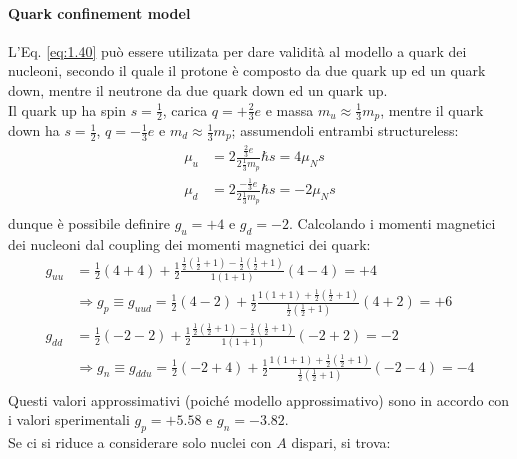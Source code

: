 \paragraph{Quark confinement model}

L'Eq. \ref{eq:1.40} può essere utilizata per dare validità al modello a quark dei nucleoni, secondo il quale il protone è composto da due quark up ed un quark down, mentre il neutrone da due quark down ed un quark up.\\
Il quark up ha spin $ s = \frac{1}{2} $, carica $ q = +\frac{2}{3}e $ e massa $ m_u \approx \frac{1}{3}m_p $, mentre il quark down ha $ s = \frac{1}{2} $, $ q = -\frac{1}{3}e $ e $ m_d \approx \frac{1}{3}m_p $; assumendoli entrambi structureless:
\begin{align*}
	\mu_u &= 2 \frac{\frac{2}{3} e}{2 \frac{1}{3}m_p} \hbar s = 4 \mu_N s \\
	\mu_d &= 2 \frac{-\frac{1}{3} e}{2 \frac{1}{3}m_p} \hbar s = -2 \mu_N s \\
\end{align*}
dunque è possibile definire $ g_u = +4 $ e $ g_d = -2 $. Calcolando i momenti magnetici dei nucleoni dal coupling dei momenti magnetici dei quark:
\begin{equation*}
	\begin{split}
		g_{uu} &= \frac{1}{2} (4 + 4) + \frac{1}{2} \frac{\frac{1}{2} \left( \frac{1}{2} + 1 \right) - \frac{1}{2} \left( \frac{1}{2} + 1 \right)}{1 (1 + 1)} \left( 4 - 4 \right) = +4\\
		       &\Longrightarrow g_p \equiv g_{uud} = \frac{1}{2} (4 - 2) + \frac{1}{2} \frac{1 \left( 1 + 1 \right) + \frac{1}{2} \left( \frac{1}{2} + 1 \right)}{\frac{1}{2} \left( \frac{1}{2} + 1 \right)} (4 + 2) = +6\\
		g_{dd} &= \frac{1}{2} (-2 -2) + \frac{1}{2} \frac{\frac{1}{2} \left( \frac{1}{2} + 1 \right) - \frac{1}{2} \left( \frac{1}{2} + 1 \right)}{1 (1 + 1)} \left( -2 +2 \right) = -2\\
		       &\Longrightarrow g_n \equiv g_{ddu} = \frac{1}{2} (-2 + 4) + \frac{1}{2} \frac{1 \left( 1 + 1 \right) + \frac{1}{2} \left( \frac{1}{2} + 1 \right)}{\frac{1}{2} \left( \frac{1}{2} + 1 \right)} (-2 -4) = -4\\
	\end{split}
\end{equation*}
Questi valori approssimativi (poiché modello approssimativo) sono in accordo con i valori sperimentali $ g_p = +5.58 $ e $ g_n = -3.82 $.\\
Se ci si riduce a considerare solo nuclei con $ A $ dispari, si trova:
